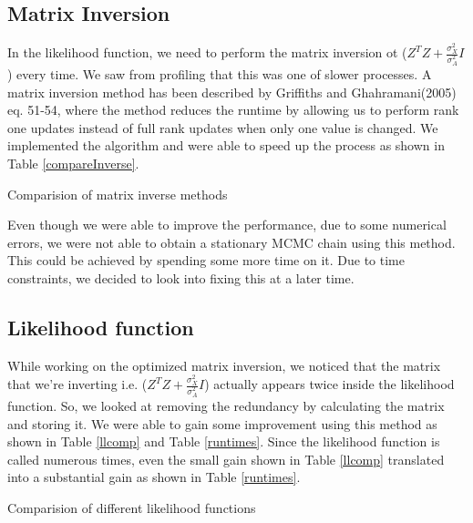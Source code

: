 \documentclass{article}
\begin{document}

\subsection{Matrix Inversion}
In the likelihood function, we need to perform the matrix inversion ot ($Z^TZ+\frac{\sigma_X^2}{\sigma_A^2}I$) every time. We saw from profiling that this was one of slower processes. A matrix inversion method has been described by Griffiths and Ghahramani(2005)~\cite{griffiths1} eq. 51-54, where the method reduces the runtime by allowing us to perform rank one updates instead of full rank updates when only one value is changed. We implemented the algorithm and were able to speed up the process as shown in Table \ref{compareInverse}.

\begin{table}[ht]
\centering
\caption{Comparision of matrix inverse methods \label{compareInverse}}

\end{table}

Even though we were able to improve the performance, due to some numerical errors, we were not able to obtain a stationary MCMC chain using this method. This could be achieved by spending some more time on it. Due to time constraints, we decided to look into fixing this at a later time.\\

\subsection{Likelihood function}
While working on the optimized matrix inversion, we noticed that the matrix that we're inverting i.e. ($Z^TZ+\frac{\sigma_X^2}{\sigma_A^2}I$) actually appears twice inside the likelihood function. So, we looked at removing the redundancy by calculating the matrix and storing it. We were able to gain some improvement using this method as shown in Table \ref{llcomp} and Table \ref{runtimes}. Since the likelihood function is called numerous times, even the small gain shown in Table \ref{llcomp} translated into a substantial gain as shown in Table \ref{runtimes}.\\


\begin{table}[ht]
\centering
\caption{Comparision of different likelihood functions \label{llcomp}}


\end{table}
\end{document}
